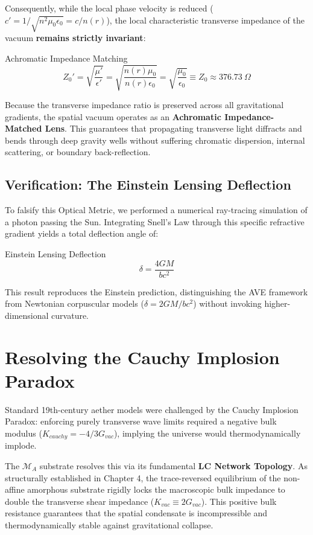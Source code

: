Consequently, while the local phase velocity is reduced ($c' = 1/\sqrt{n^2\mu_0 \epsilon_0} = c/n(r)$), the local characteristic transverse impedance of the vacuum \textbf{remains strictly invariant}:
\begin{resultbox}{Achromatic Impedance Matching}
\begin{equation}
    Z_0' = \sqrt{\frac{\mu'}{\epsilon'}} = \sqrt{\frac{n(r)\mu_0}{n(r)\epsilon_0}} = \sqrt{\frac{\mu_0}{\epsilon_0}} \equiv Z_0 \approx 376.73\ \Omega
\end{equation}
\end{resultbox}

Because the transverse impedance ratio is preserved across all gravitational gradients, the spatial vacuum operates as an \textbf{Achromatic Impedance-Matched Lens}. This guarantees that propagating transverse light diffracts and bends through deep gravity wells without suffering chromatic dispersion, internal scattering, or boundary back-reflection.


\subsection{Verification: The Einstein Lensing Deflection}
To falsify this Optical Metric, we performed a numerical ray-tracing simulation of a photon passing the Sun. Integrating Snell's Law through this specific refractive gradient yields a total deflection angle of:
\begin{resultbox}{Einstein Lensing Deflection}
\begin{equation}
    \delta = \frac{4GM}{b c^2}
\end{equation}
\end{resultbox}
This result reproduces the Einstein prediction, distinguishing the AVE framework from Newtonian corpuscular models ($\delta = 2GM/bc^2$) without invoking higher-dimensional curvature.

\section{Resolving the Cauchy Implosion Paradox}

Standard 19th-century aether models were challenged by the Cauchy Implosion Paradox:
enforcing purely transverse wave limits required a negative bulk modulus ($K_{cauchy}=
-4/3G_{vac}$), implying the universe would thermodynamically implode.

The $\mathcal{M}_{A}$ substrate resolves this via its fundamental \textbf{LC Network Topology}. As structurally established
in Chapter 4, the trace-reversed equilibrium of the non-affine amorphous substrate rigidly
locks the macroscopic bulk impedance to double the transverse shear impedance ($K_{vac}\equiv2G_{vac}$).
This positive bulk resistance guarantees that the spatial condensate is
incompressible and thermodynamically stable against gravitational collapse.

